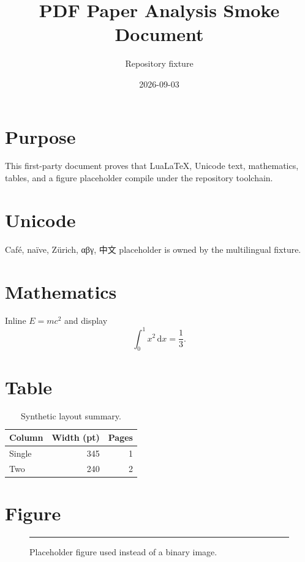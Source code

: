 \documentclass[11pt,a4paper]{article}
\title{PDF Paper Analysis Smoke Document}
\author{Repository fixture}
\date{2026-09-03}%
\begin{document}
\maketitle

\section{Purpose}
This first-party document proves that LuaLaTeX, Unicode text, mathematics,
tables, and a figure placeholder compile under the repository toolchain.

\section{Unicode}
Café, naïve, Zürich, αβγ, 中文 placeholder is owned by the multilingual fixture.

\section{Mathematics}
Inline \(E = mc^{2}\) and display
\[
  \int_{0}^{1} x^{2}\,\mathrm{d}x = \frac{1}{3}.
\]

\section{Table}
\begin{table}[htbp]
  \centering
  \begin{tabular}{lrr}
    \toprule
    Column & Width (pt) & Pages \\
    \midrule
    Single & 345        & 1     \\
    Two    & 240        & 2     \\
    \bottomrule
  \end{tabular}
  \caption{Synthetic layout summary.}
\end{table}

\section{Figure}
\begin{figure}[htbp]
  \centering
  \rule{4cm}{2.5cm}
  \caption{Placeholder figure used instead of a binary image.}
\end{figure}
\end{document}

